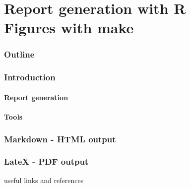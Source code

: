 \part{Report generation with R \protect\\
      Figures with make}

\frame{\partpage}



\section*{Outline}



\section{Introduction}



\subsection{Report generation}

\subsection{Tools}



\section{Markdown - HTML output}



\section{LateX - PDF output}



\begin{frame}
    
    useful links and references
    
\end{frame}


